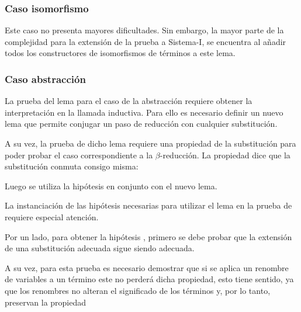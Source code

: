 \subsubsection{Caso isomorfismo}

Este caso no presenta mayores dificultades. Sin embargo, la mayor parte de la complejidad para la extensión de la prueba a Sistema-I, se encuentra al añadir todos los constructores de isomorfismos de términos a este lema.


\subsubsection{Caso abstracción}

La prueba del lema para el caso de la abstracción requiere obtener la interpretación  en la llamada inductiva.
Para ello es necesario definir un nuevo lema que permite conjugar un paso de reducción con cualquier substitución.


A su vez, la prueba de dicho lema requiere una propiedad de la substitución para poder probar el caso correspondiente a la $\beta$-reducción.
La propiedad  dice que la substitución conmuta consigo misma:


Luego se utiliza la hipótesis  en conjunto con el nuevo lema.


La instanciación de las hipótesis necesarias para utilizar el lema en la prueba de  requiere especial atención.

Por un lado, para obtener la hipótesis \snstar {}, primero se debe probar que la extensión de una substitución adecuada sigue siendo adecuada.


A su vez, para esta prueba es necesario demostrar que si se aplica un renombre de variables a un término \snstar este no perderá dicha propiedad, esto tiene sentido, ya que los renombres no alteran el significado de los términos y, por lo tanto, preservan la propiedad \snstar

